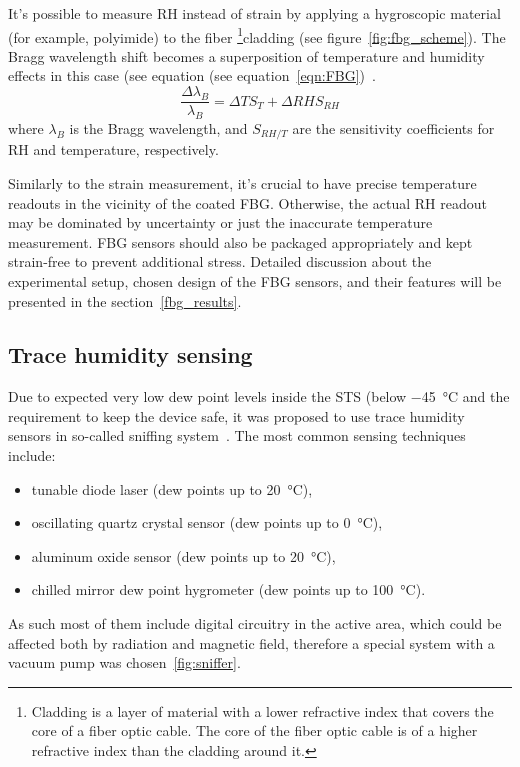 It's possible to measure RH instead of strain by applying a hygroscopic material (for example, polyimide) to the fiber \footnote{Cladding is a layer of material with a lower refractive index that covers the core of a fiber optic cable. The core of the fiber optic cable is of a higher refractive index than the cladding around it.}{cladding} (see figure~\ref{fig:fbg_scheme}). The  Bragg wavelength shift becomes a superposition of temperature and humidity effects in this case (see equation (see equation~\ref{eqn:FBG})~\cite{Kronenberg:02, YEO_PI}. 
                             \begin{equation}\label{eqn:FBG}
                                    \frac{\Delta\lambda_{B}}{\lambda_{B}}=\Delta TS_{T}+\Delta RHS_{RH}
                            \end{equation}
                            where $\lambda_{B}$ is the Bragg wavelength, and $S_{RH/T}$ are the sensitivity coefficients for RH and temperature, respectively. 

Similarly to the strain measurement, it’s crucial to have precise temperature readouts in the vicinity of the coated \gls{FBG}. Otherwise, the actual RH readout may be dominated by uncertainty or just the inaccurate temperature measurement. \gls{FBG} sensors should also be packaged appropriately and kept strain-free to prevent additional stress. Detailed discussion about the experimental setup, chosen design of the \gls{FBG} sensors, and their features will be presented in the section~\ref{fbg_results}.



\subsection{Trace humidity sensing}
Due to expected very low dew point levels inside the \gls{STS} (below \SI{-45}{\celsius} and the requirement to keep the device safe, it was proposed to use trace humidity sensors in so-called sniffing system~\cite{Berruti}.
The most common sensing techniques include:
\begin{itemize}
    \item tunable diode laser (dew points up to \SI{20}{\celsius}),
    \item oscillating quartz crystal sensor (dew points up to \SI{0}{\celsius}),
    \item aluminum oxide sensor (dew points up to \SI{20}{\celsius}),
    \item chilled mirror dew point hygrometer  (dew points up to \SI{100}{\celsius}).
\end{itemize}
As such most of them include digital circuitry in the active area, which could be affected both by radiation and magnetic field, therefore a special system with a vacuum pump was chosen~\ref{fig:sniffer}. 

